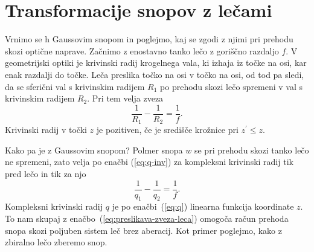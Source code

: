 \section{Transformacije snopov z lečami}

Vrnimo se h Gaussovim snopom in poglejmo, kaj se zgodi z njimi pri prehodu
skozi optične naprave. Začnimo
z enostavno tanko lečo z goriščno razdaljo $f$. V geometrijski optiki
je krivinski radij krogelnega vala, ki izhaja iz točke na osi, kar
enak razdalji do točke. Leča preslika točko na osi v točko na osi,
od tod pa sledi, da se sferični val s krivinskim radijem $R_{1}$
po prehodu skozi lečo spremeni v val s krivinskim radijem $R_{2}$.
Pri tem velja zveza 
\begin{equation}
\frac{1}{R_{1}}-\frac{1}{R_{2}}=\frac{1}{f}.
\end{equation}
Krivinski radij v točki $z$ je pozitiven, če je središče krožnice pri $z^{\prime}\le z$.


Kako pa je z Gaussovim snopom? Polmer snopa $w$ se pri prehodu 
skozi tanko lečo ne spremeni, zato velja po enačbi (\ref{eq:q-inv}) za
kompleksni krivinski radij tik pred lečo in tik za njo
\begin{equation}
\frac{1}{q_{1}}-\frac{1}{q_{2}}=\frac{1}{f}.
\label{eq:preslikava-zveza-leca}
\end{equation}
Kompleksni krivinski radij $q$ je po enačbi~(\ref{eq:q}) linearna funkcija koordinate $z$.
To nam skupaj z enačbo~(\ref{eq:preslikava-zveza-leca})
omogoča račun prehoda snopa skozi poljuben sistem leč brez aberacij.
Kot primer poglejmo, kako z zbiralno lečo zberemo snop.


